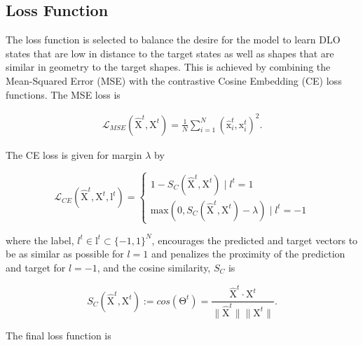 \documentclass[letterpaper, 10 pt, conference]{IEEETran}
\newcommand{\mat}[1]{\bm{\mathrm{#1}}}
\begin{document}


\subsection{Loss Function}

The loss function is selected to balance the desire for the model to learn DLO states that are low in distance to the target states as well as shapes that are similar in geometry to the target shapes. This is achieved by combining the Mean-Squared Error (MSE) with the contrastive Cosine Embedding (CE) loss functions. The MSE loss is

\begin{gather}
    \mathcal{L}_{MSE}(\hat{\mat{X}}^t, \mat{X}^t) = \frac{1}{N} \sum_{i=1}^N \left(\hat{\mat{x}}_i^t, \mat{x}_i^t\right)^2.
\end{gather}

\noindent The CE loss is given for margin $\lambda$ by

\begin{equation}
    \mathcal{L}_{CE}(\hat{\mat{X}}^t, \mat{X}^t, \mat{l}^t) = \left\{ 
    \begin{matrix} 1 - S_C (\hat{\mat{X}}^t, \mat{X}^t) \mid l^t = 1 \\
    \text{max}(0, S_C (\hat{\mat{X}}^t, \mat{X}^t) - \lambda) \mid l^t = -1
    \end{matrix}
    \right.
\end{equation}

\noindent where the label, $l^t \in \mat{l}^t \subset \{-1, 1\}^N$, encourages the predicted and target vectors to be as similar as possible for $l=1$ and penalizes the proximity of the prediction and target for $l=-1$, and the cosine similarity, $S_C$ is

\begin{equation}
    S_C(\hat{\mat{X}}^t, \mat{X}^t) := cos(\mat{\Theta}^t) = \frac{\hat{\mat{X}}^{t} \cdot \mat{X}^t}{\| \hat{\mat{X}}^t \| \| \mat{X}^t \|}.
\end{equation}

\noindent The final loss function is
\end{document}
